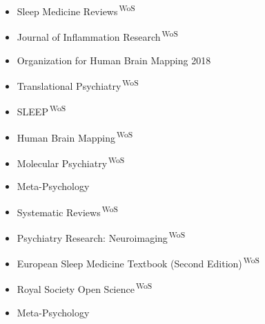 \documentclass[10pt,a4paper,twocolumn]{article}
\begin{document}
\begin{itemize}
\begin{itemize}
        \item Sleep Medicine Reviews\textsuperscript{\,\scriptsize WoS}
        
    
        
        \item Journal of Inflammation Research\textsuperscript{\,\scriptsize WoS}
        
    
        
        \item Organization for Human Brain Mapping 2018
        
    
        
        \item Translational Psychiatry\textsuperscript{\,\scriptsize WoS}
        
    
        
        \item SLEEP\textsuperscript{\,\scriptsize WoS}
        
    
        
        \item Human Brain Mapping\textsuperscript{\,\scriptsize WoS}
        
    
        
        \item Molecular Psychiatry\textsuperscript{\,\scriptsize WoS}
        
    
        
        \item Meta-Psychology
        
    
        
        \item Systematic Reviews\textsuperscript{\,\scriptsize WoS}
        
    
        
        \item Psychiatry Research: Neuroimaging\textsuperscript{\,\scriptsize WoS}
        
    
        
        \item European Sleep Medicine Textbook (Second Edition)\textsuperscript{\,\scriptsize WoS}
        
    
        
        \item Royal Society Open Science\textsuperscript{\,\scriptsize WoS}
        
    
        
        \item Meta-Psychology
        

\end{itemize}
\end{itemize}
\end{document}
